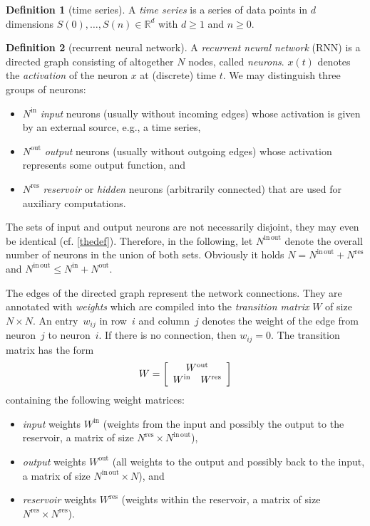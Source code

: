 \documentclass{sn-jnl}
\theoremstyle{definition}
\newtheorem{defn}{Definition}
\begin{document}
\begin{defn}[time series]
A \emph{time series} is a series of data points in $d$ dimensions
$S(0),\dots,S(n) \in \mathbb{R}^d$ with $d \ge 1$ and $n \ge 0$.
\end{defn}

\begin{defn}[recurrent neural network]
A \emph{recurrent neural network} (RNN) is a directed graph consisting of
altogether $N$ nodes, called \emph{neurons}. $x(t)$ denotes the
\emph{activation} of the neuron $x$ at (discrete) time $t$. We may distinguish
three groups of neurons:
\begin{itemize}
  \item $N^\mathrm{in}$ \emph{input} neurons (usually without incoming edges)
	whose activation is given by an external source, e.g., a time series,
  \item $N^\mathrm{out}$ \emph{output} neurons (usually without outgoing edges)
	whose activation represents some output function, and
  \item $N^\mathrm{res}$ \emph{reservoir} or \emph{hidden} neurons (arbitrarily
	connected) that are used for auxiliary computations.
\end{itemize}
The sets of input and output neurons are not necessarily disjoint, they may even
be identical (cf. \cref{thedef}). Therefore, in the following, let
$N^\mathrm{in\,out}$ denote the overall number of neurons in the union of both
sets. Obviously it holds $N = N^\mathrm{in\,out}+N^\mathrm{res}$ and
$N^\mathrm{in\,out} \le N^\mathrm{in}+N^\mathrm{out}$.

The edges of the directed graph represent the network connections. They are
annotated with \emph{weights} which are compiled into the \emph{transition
matrix} $W$ of size $N \times N$. An entry~$w_{ij}$ in row~$i$ and column~$j$
denotes the weight of the edge from neuron~$j$ to neuron~$i$. If there is no
connection, then $w_{ij} = 0$. The transition matrix has the form
\begin{equation}\label{matrix}
  W = \left[ \begin{array}{cc}
  \multicolumn{2}{c}{W^\mathrm{out}}\\
  W^\mathrm{in} & W^\mathrm{res}
\end{array} \right]
\end{equation}
containing the following weight matrices:
\begin{itemize}
  \item \emph{input} weights $W^\mathrm{in}$ (weights from the input and
	possibly the output to the reservoir, a matrix of size $N^\mathrm{res} \times N^\mathrm{in\,out}$),
  \item \emph{output} weights $W^\mathrm{out}$ (all weights to the output and
	possibly back to the input, a matrix of size $N^\mathrm{in\,out} \times N$), and
  \item \emph{reservoir} weights $W^\mathrm{res}$ (weights within the reservoir,
	a matrix of size $N^\mathrm{res} \times N^\mathrm{res}$).
\end{itemize}
\end{defn}
\end{document}
